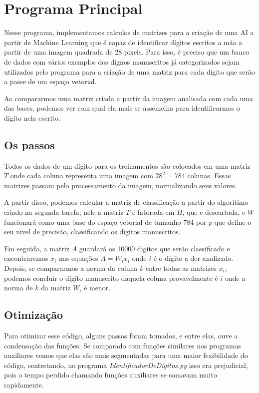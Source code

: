 \documentclass[a4paper, 12pt]{article}
\begin{document}
\section{Programa Principal}

    Nesse programa, implementamos calculos de matrizes para a criação de uma AI a partir de Machine Learning que é capaz de identificar dígitos escritos a mão a partir de uma imagem quadrada de 28 pixels.
    Para isso, é preciso que um banco de dados com vários exemplos dos dignos manuscritos já categorizados sejam utilizados pelo programa para a criação de uma matriz para cada digito que serão a passe de um espaço vetorial.

    Ao compararmos uma matriz criada a partir da imagem analisada com cada uma das bases, podemos ver com qual ela mais se assemelha para identificarmos o dígito nela escrito.

\subsection{Os passos}

    Todos os dados de um dígito para os treinamentos são colocados em uma matriz $T$ onde cada coluna representa uma imagem com $28^2 = 784$ colunas.
    Essas matrizes passam pelo processamento da imagem, normalizando seus valores.

    A partir disso, podemos calcular a matriz de classificação a partir do algorítimo criado na segunda tarefa, nele a matriz $T$ é fatorada em $H$, que e descartada, e $W$ funcionará como uma base do espaço vetorial de tamanho 784 por $p$ que define o seu nivel de precisão, classificando os dígitos manuscritos.

    Em seguida, a matriz $A$ guardará os 10000 digitos que serão classificado e encontraremos $x_{i}$ nas equações $A = W_{i} x_{i}$ onde $i$ é o dígito a der analizado.
    Depois, se compararmos a norma da coluna $k$ entre todas as matrizes $x_{i}$, podemos concluir o dígito manuscrito daquela coluna provavelmente é $i$ onde a norma de $k$ da matriz $W_{i}$ é menor.

\subsection{Otimização}

    Para otimizar esse código, alguns passos foram tomados, e entre elas, ouve a condensação das funções.
    Se comparado com funções similares nos programas auxiliares vemos que elas são mais segmentadas para uma maior fexibilidade do código, eentretando, no programa \textit{IdentificadorDeDígitos.py} isso era prejudicial, pois o tempo perdido chamando funções auxiliares se somavam muito rapidamente.
\end{document}
